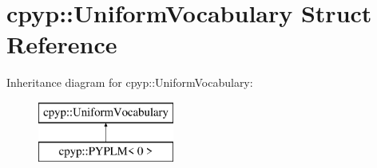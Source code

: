 \hypertarget{structcpyp_1_1_uniform_vocabulary}{}\section{cpyp\+:\+:Uniform\+Vocabulary Struct Reference}
\label{structcpyp_1_1_uniform_vocabulary}
Inheritance diagram for cpyp\+:\+:Uniform\+Vocabulary\+:\begin{figure}[H]
\begin{center}
\leavevmode
\includegraphics[height=2.000000cm]{structcpyp_1_1_uniform_vocabulary}
\end{center}
\end{figure}
